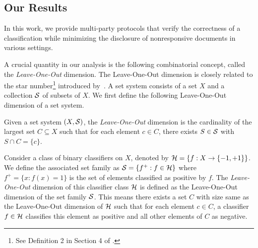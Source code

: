 


\subsection{Our Results}

In this work, we provide multi-party protocols that verify the correctness of a classification while minimizing the disclosure of nonresponsive documents in various settings.

A crucial quantity in our analysis is the following combinatorial concept, called the \emph{Leave-One-Out} dimension.
The Leave-One-Out dimension is closely related to the star number\footnote{See Definition 2 in Section 4 of \cite{hanneke2015minimax}.} introduced by~\cite{hanneke2015minimax}.
A set system consists of a set $X$ and a collection $\mathcal{S}$ of subsets of $X$. 
We first define the following Leave-One-Out dimension of a set system. 

\begin{definition}
\label{defn:leave_one_out}
     Given a set system $(X,\mathcal{S})$, the \emph{Leave-One-Out} dimension is the cardinality of the largest set $C\subseteq X$ such that for each element $c \in C$, there exists $S \in \mathcal{S}$ with $S \cap C = \{c\}$.
\end{definition}

Consider a class of binary classifiers on $X$, denoted by $\mathcal{H} = \{f:X \to \{-1,+1\}\}$. We define the associated set family as $\mathcal{S} = \{f^+ : f \in \mathcal{H}\}$ where $f^+ = \{x: f(x) = 1\}$ is the set of elements classified as positive by $f$. The \emph{Leave-One-Out} dimension of this classifier class $\mathcal{H}$ is defined as the Leave-One-Out dimension of the set family $\mathcal{S}$. This means there exists a set $C$ with size same as the Leave-One-Out dimension of $\mathcal{H}$ such that for each element $c \in C$, a classifier $f \in \mathcal{H}$ classifies this element as positive and all other elements  of $C$ as negative.   


